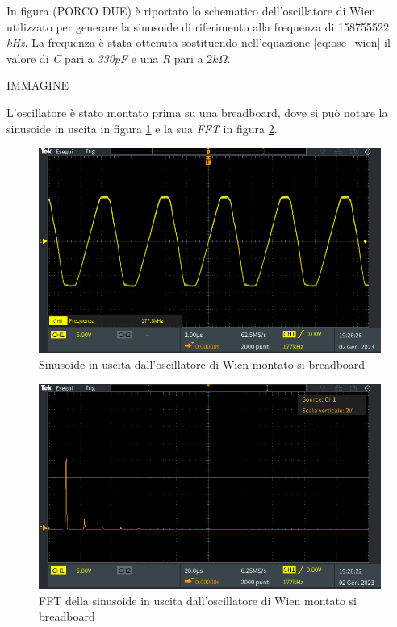 \documentclass[titlepage]{report}
\begin{document}
	In figura (PORCO DUE) è riportato lo schematico dell'oscillatore di Wien utilizzato per generare la sinusoide di riferimento alla frequenza di 158755522 \textit{kHz}. La frequenza è stata ottenuta sostituendo nell'equazione \ref{eq:osc_wien} il valore di \textit{C} pari a \textit{330pF} e una \textit{R} pari a \textit{$2 k\Omega$}.

	IMMAGINE

	L'oscillatore è stato montato prima su una breadboard, dove si può notare la sinusoide in uscita in figura \ref{fig:SINwien breadboard} e la sua \textit{FFT} in figura \ref{fig:FFT SINwien breadboard}.


	\begin{figure}[H]
		\centering
		\includegraphics[scale=0.5]{Immagini/Wien sin giusto bread.PNG}
		\caption{Sinusoide in uscita dall'oscillatore di Wien montato si breadboard}
		\label{fig:SINwien breadboard}
	\end{figure} 

	\begin{figure}[H]
		\centering
		\includegraphics[scale=0.5]{Immagini/FFT wien giusto bread.PNG}
		\caption{FFT della sinusoide in uscita dall'oscillatore di Wien montato si breadboard}
		\label{fig:FFT SINwien breadboard}
	\end{figure} 
\end{document}
